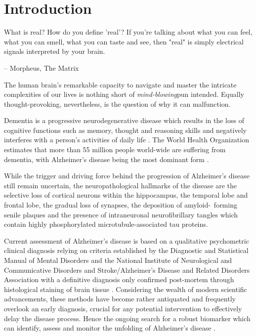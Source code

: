 \section{Introduction}

\epigraph{What is real? How do you define 'real'? If you're talking about what you can feel, what you can smell, what you can taste and see, then "real" is simply electrical signals interpreted by your brain.}{-- Morpheus, The Matrix}


The human brain's remarkable capacity to navigate and master the intricate complexities of our lives is nothing short of \emph{mind-blowing}\textemdash{}pun intended. Equally thought-provoking, nevertheless, is the question of why it can malfunction.

Dementia is a progressive neurodegenerative disease which results in the loss of cognitive functions such as memory, thought and reasoning skills and negatively interferes with a person's activities of daily life \cite{b1}. The World Health Organization estimates that more than 55 million people world-wide are suffering from dementia, with Alzheimer's disease being the most dominant form \cite{b2}. 

While the trigger and driving force behind the progression of Alzheimer's disease still remain uncertain, the neuropathological hallmarks of the disease are the selective loss of cortical neurons within the hippocampus, the temporal lobe and frontal lobe, the gradual loss of synapses, the deposition of amyloid-\textbeta\ forming senile plaques and the presence of intraneuronal neurofibrillary tangles which contain highly phosphorylated microtubule-associated tau proteins. \cite{b3,b4} 

Current assessment of Alzheimer's disease is based on a qualitative psychometric clinical diagnosis relying on criteria established by the Diagnostic and Statistical Manual of Mental Disorders and the National Institute of Neurological and Communicative Disorders and Stroke/Alzheimer's Disease and Related Disorders Association with a definitive diagnosis only confirmed post-mortem through histological staining of brain tissue \cite{b4,b5}. Considering the wealth of modern scientific advancements, these methods have become rather antiquated and frequently overlook an early diagnosis, crucial for any potential intervention to effectively delay the disease process. Hence the ongoing search for a robust biomarker which can identify, assess and monitor the unfolding of Alzheimer's disease \cite{b4}.


